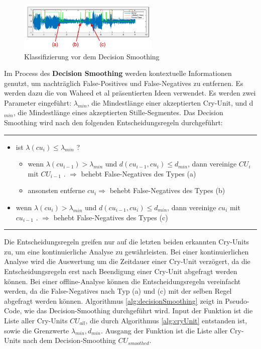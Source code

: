 \begin{figure}[h]
	\centering
	\includegraphics[width=0.6\textwidth]{bilder/smoothing02.png}
	\caption{Klassifizierung vor dem Decision Smoothing}
	\label{img:beforeSmoothing}
\end{figure}

Im Process des \textbf{Decision Smoothing} werden kontextuelle Informationen genutzt, um nachträglich False-Positives und False-Negatives zu entfernen. Es werden dazu die von Waheed et al \cite{vad_entropy} präsentierten Ideen verwendet. Es werden zwei Parameter eingeführt: $\lambda_{min}$, die Mindestlänge einer akzeptierten Cry-Unit, und d$_{min}$, die Mindestlänge eines akzeptierten Stille-Segmentes. Das Decision Smoothing wird nach den folgenden Entscheidungsregeln durchgeführt:

\noindent\rule{\linewidth}{0.3pt}
\begin{itemize}
	\item ist $\lambda (cu_{i}) \leq \lambda_{min}$ ?
	\begin{itemize}
		\item wenn $\lambda (cu_{i-1}) > \lambda_{min}$ und $d (cu_{i-1}, cu_{i}) \leq d_{min}$, dann vereinige $CU_{i}$ mit $CU_{i-1}$ . $\Rightarrow$ behebt False-Negatives des Types (a)
		\item ansonsten entferne $cu_i \Rightarrow$ behebt False-Negatives des Types (b)
	\end{itemize}
	\item wenn $\lambda (cu_{i}) > \lambda_{min}$ und $d (cu_{i-1}, cu_{i}) \leq d_{min}$, dann vereinige $cu_{i}$ mit $cu_{i-1}$ . $\Rightarrow$ behebt False-Negatives des Types (c)
\end{itemize}
\noindent\rule{\linewidth}{0.3pt}

Die Entscheidungsregeln greifen nur auf die letzten beiden erkannten Cry-Units zu, um eine kontinuierliche Analyse zu gewährleisten. Bei einer kontinuierlichen Analyse wird die Auswertung um die Zeitdauer einer Cry-Unit verzögert, da die Entscheidungsregeln erst nach Beendigung einer Cry-Unit abgefragt werden können. Bei einer offline-Analyse können die Entscheidungsregeln vereinfacht werden, da die False-Negatives nach Typ (a) und (c) mit der selben Regel abgefragt werden können. Algorithmus \ref{alg:decisionSmoothing} zeigt in Pseudo-Code, wie das Decision-Smoothing durchgeführt wird. Input der Funktion ist die Liste aller Cry-Units $CU_{all}$, die durch Algorithmus \ref{alg:cryUnit} entstanden ist, sowie die Grenzwerte $\lambda_{min}, d_{min}$. Ausgang der Funktion ist die Liste aller Cry-Units nach dem Decision-Smoothing $CU_{smoothed}$.

